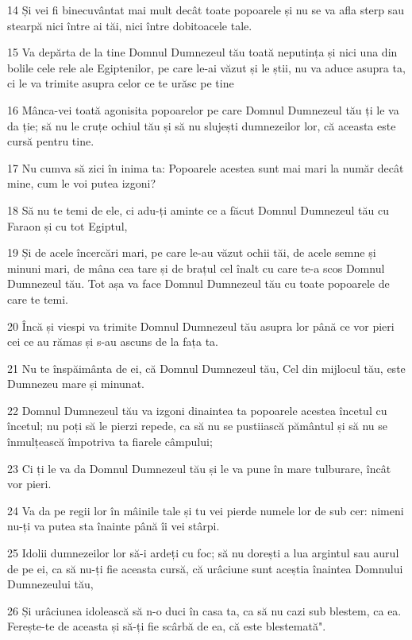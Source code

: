 \par 14 Și vei fi binecuvântat mai mult decât toate popoarele și nu se va afla sterp sau stearpă nici între ai tăi, nici între dobitoacele tale.
\par 15 Va depărta de la tine Domnul Dumnezeul tău toată neputința și nici una din bolile cele rele ale Egiptenilor, pe care le-ai văzut și le știi, nu va aduce asupra ta, ci le va trimite asupra celor ce te urăsc pe tine
\par 16 Mânca-vei toată agonisita popoarelor pe care Domnul Dumnezeul tău ți le va da ție; să nu le cruțe ochiul tău și să nu slujești dumnezeilor lor, că aceasta este cursă pentru tine.
\par 17 Nu cumva să zici în inima ta: Popoarele acestea sunt mai mari la număr decât mine, cum le voi putea izgoni?
\par 18 Să nu te temi de ele, ci adu-ți aminte ce a făcut Domnul Dumnezeul tău cu Faraon și cu tot Egiptul,
\par 19 Și de acele încercări mari, pe care le-au văzut ochii tăi, de acele semne și minuni mari, de mâna cea tare și de brațul cel înalt cu care te-a scos Domnul Dumnezeul tău. Tot așa va face Domnul Dumnezeul tău cu toate popoarele de care te temi.
\par 20 Încă și viespi va trimite Domnul Dumnezeul tău asupra lor până ce vor pieri cei ce au rămas și s-au ascuns de la fața ta.
\par 21 Nu te înspăimânta de ei, că Domnul Dumnezeul tău, Cel din mijlocul tău, este Dumnezeu mare și minunat.
\par 22 Domnul Dumnezeul tău va izgoni dinaintea ta popoarele acestea încetul cu încetul; nu poți să le pierzi repede, ca să nu se pustiiască pământul și să nu se înmulțească împotriva ta fiarele câmpului;
\par 23 Ci ți le va da Domnul Dumnezeul tău și le va pune în mare tulburare, încât vor pieri.
\par 24 Va da pe regii lor în mâinile tale și tu vei pierde numele lor de sub cer: nimeni nu-ți va putea sta înainte până îi vei stârpi.
\par 25 Idolii dumnezeilor lor să-i ardeți cu foc; să nu dorești a lua argintul sau aurul de pe ei, ca să nu-ți fie aceasta cursă, că urâciune sunt aceștia înaintea Domnului Dumnezeului tău,
\par 26 Și urâciunea idolească să n-o duci în casa ta, ca să nu cazi sub blestem, ca ea. Ferește-te de aceasta și să-ți fie scârbă de ea, că este blestemată".

